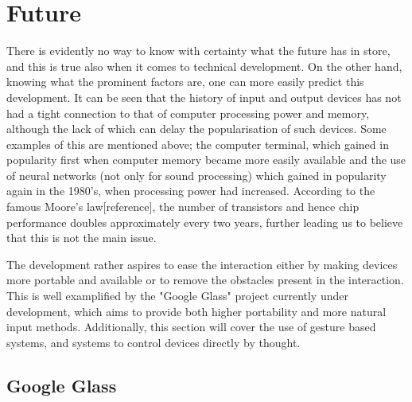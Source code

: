 
\section{Future}
There is evidently no way to know with certainty what the future has in store, and this is true also when it comes to technical development. On the other hand, knowing what the prominent factors are, one can more easily predict this development. It can be seen that the history of input and output devices has not had a tight connection to that of computer processing power and memory, although the lack of which can delay the popularisation of such devices. Some examples of this are mentioned above; the computer terminal, which gained in popularity first when computer memory became more easily available and the use of neural networks (not only for sound processing) which gained in popularity again in the 1980's, when processing power had increased. According to the famous Moore's law[reference], the number of transistors and hence chip performance doubles approximately every two years, further leading us to believe that this is not the main issue.

The development rather aspires to ease the interaction either by making devices more portable and available or to remove the obstacles present in the interaction. This is well examplified by the "Google Glass" project currently under development, which aims to provide both higher portability and more natural input methods. Additionally, this section will cover the use of gesture based systems, and systems to control devices directly by thought.

\subsection{Google Glass}


